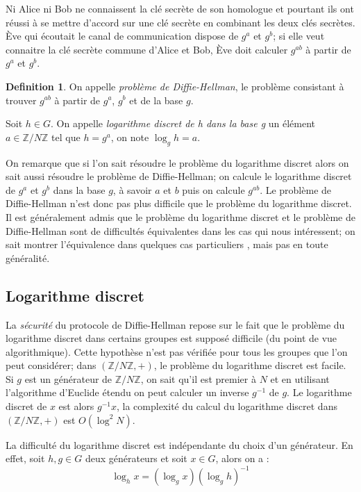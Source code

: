 \documentclass[a4paper]{article}
\theoremstyle{definition}
\newtheorem{definition}{Definition}[section]
\theoremstyle{remark}
\numberwithin{equation}{section}
\begin{document}
Ni Alice ni Bob ne connaissent la clé secrète de son homologue et pourtant ils ont réussi à se mettre d'accord sur une clé secrète en combinant les deux clés secrètes. Ève qui écoutait le canal de communication dispose de $g^a$ et $g^b$; si elle veut connaitre la clé secrète commune d'Alice et Bob, Ève doit calculer $g^{ab}$ à partir de $g^a$ et $g^b$.

\begin{definition}
On appelle \emph{problème de Diffie-Hellman}, le problème consistant à trouver $g^{ab}$ à partir de $g^a$, $g^b$ et de la base $g$.

Soit $h \in G$. On appelle \emph{logarithme discret de h dans la base g} un élément $a \in \mathbb{Z}/N\mathbb{Z}$ tel que $h=g^a$, on note $\log_g h = a$.
\end{definition}

On remarque que si l'on sait résoudre le problème du logarithme discret alors on sait aussi résoudre le problème de Diffie-Hellman; on calcule le logarithme discret de $g^a$ et $g^b$ dans la base $g$, à savoir $a$ et $b$ puis on calcule $g^{ab}$. Le problème de Diffie-Hellman n'est donc pas plus difficile que le problème du logarithme discret. Il est généralement admis que le problème du logarithme discret et le problème de Diffie-Hellman sont de difficultés équivalentes dans les cas qui nous intéressent; on sait montrer l'équivalence dans quelques cas particuliers \citep{maurer} \citep{muzereau},
mais pas en toute généralité.

\subsection{Logarithme discret}
La \emph{sécurité} du protocole de Diffie-Hellman repose sur le fait que le problème du logarithme discret dans certains groupes est supposé difficile (du point de vue algorithmique). Cette hypothèse n'est pas vérifiée pour tous les groupes que l'on peut considérer; dans $(\mathbb{Z}/N\mathbb{Z},+)$, le problème du logarithme discret est facile. Si $g$ est un générateur de $\mathbb{Z}/N\mathbb{Z}$, on sait qu'il est premier à $N$ et en utilisant l'algorithme d'Euclide étendu on peut calculer un inverse $g^{-1}$ de $g$. Le logarithme discret de $x$ est alors $g^{-1}x$, la complexité du calcul du logarithme discret dans $(\mathbb{Z}/N\mathbb{Z},+)$ est $O(\log^2N)$.

La difficulté du logarithme discret est indépendante du choix d'un générateur. En effet, soit $h,g \in G$ deux générateurs et soit $x \in G$, alors on a :
$$\log_h x = (\log_g x)(\log_g h)^{-1}$$
\end{document}
